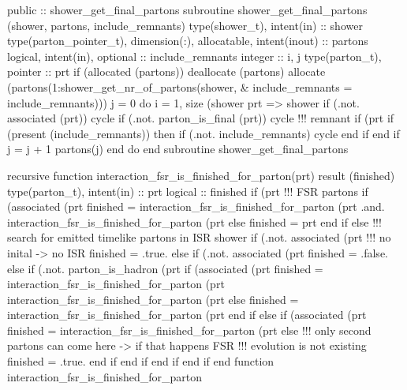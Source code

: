 \eatline
\nwendcode{}\nwdocspar
\nwenddocs{}\plusendmoddef
  public :: shower_get_final_partons
\nwendcode{}\plusendmoddef
  subroutine shower_get_final_partons (shower, partons, include_remnants)
    type(shower_t), intent(in) :: shower
    type(parton_pointer_t), dimension(:), allocatable, intent(inout) :: partons
    logical, intent(in), optional :: include_remnants
    integer :: i, j
    type(parton_t), pointer :: prt
    if (allocated (partons))  deallocate (partons)
    allocate (partons(1:shower_get_nr_of_partons(shower, &
         include_remnants = include_remnants)))
    j = 0
    do i = 1, size (shower%
       prt => shower%
       if (.not. associated (prt)) cycle
       if (.not. parton_is_final (prt)) cycle
       !!! remnant
       if (prt%
          if (present (include_remnants)) then
             if (.not. include_remnants) cycle
          end if
       end if
       j = j + 1
       partons(j)%
    end do
  end subroutine shower_get_final_partons

\eatline
\nwendcode{}\nwdocspar
\nwenddocs{}\plusendmoddef
  recursive function interaction_fsr_is_finished_for_parton(prt) result (finished)
    type(parton_t), intent(in) :: prt
    logical :: finished
    if (prt%
       !!! FSR partons
       if (associated (prt%
          finished = interaction_fsr_is_finished_for_parton (prt%
               .and. interaction_fsr_is_finished_for_parton (prt%
       else
          finished = prt%
       end if
    else
       !!! search for emitted timelike partons in ISR shower
       if (.not. associated (prt%
          !!! no inital -> no ISR
          finished = .true.
       else if (.not. associated (prt%
          finished = .false.
       else
          if (.not. parton_is_hadron (prt%
             if (associated (prt%
                finished = interaction_fsr_is_finished_for_parton (prt%
                     interaction_fsr_is_finished_for_parton (prt%
             else
                finished = interaction_fsr_is_finished_for_parton (prt%
             end if
          else
             if (associated (prt%
                finished = interaction_fsr_is_finished_for_parton (prt%
             else
                !!! only second partons can come here -> if that happens FSR
                !!!     evolution is not existing
                finished = .true.
             end if
          end if
       end if
    end if
  end function interaction_fsr_is_finished_for_parton

